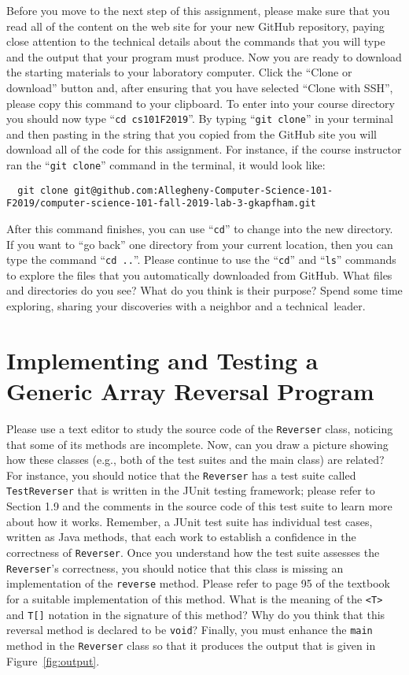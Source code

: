 \documentclass[11pt]{article}
\newcommand{\mainprogram}{\lstinline{Reverser}}
\newcommand{\testprogram}{\lstinline{TestReverser}}
\newcommand{\command}[1]{``\lstinline{#1}''}
\newcommand{\program}[1]{\lstinline{#1}}
\newcommand{\step}[1]{``{#1}''}
\begin{document}
Before you move to the next step of this assignment, please make sure that you
read all of the content on the web site for your new GitHub repository, paying
close attention to the technical details about the commands that you will type
and the output that your program must produce. Now you are ready to download the
starting materials to your laboratory computer. Click the ``Clone or download''
button and, after ensuring that you have selected ``Clone with SSH'', please
copy this command to your clipboard. To enter into your course directory you
should now type \command{cd cs101F2019}. By typing \command{git clone} in your
terminal and then pasting in the string that you copied from the GitHub site you
will download all of the code for this assignment. For instance, if the course
instructor ran the \command{git clone} command in the terminal, it would look
like:

\begin{lstlisting}
  git clone git@github.com:Allegheny-Computer-Science-101-F2019/computer-science-101-fall-2019-lab-3-gkapfham.git
\end{lstlisting}

After this command finishes, you can use \command{cd} to change into the new
directory. If you want to \step{go back} one directory from your current
location, then you can type the command \command{cd ..}. Please continue to use
the \command{cd} and \command{ls} commands to explore the files that you
automatically downloaded from GitHub. What files and directories do you see?
What do you think is their purpose? Spend some time exploring, sharing your
discoveries with a neighbor and a \mbox{technical leader}.

\section*{Implementing and Testing a Generic Array Reversal Program}

Please use a text editor to study the source code of the \mainprogram{} class,
noticing that some of its methods are incomplete. Now, can you draw a picture
showing how these classes (e.g., both of the test suites and the main class) are
related? For instance, you should notice that the \mainprogram{} has a test
suite called \testprogram{} that is written in the JUnit testing framework;
please refer to Section 1.9 and the comments in the source code of this test
suite to learn more about how it works. Remember, a JUnit test suite has
individual test cases, written as Java methods, that each work to establish a
confidence in the correctness of \mainprogram{}. Once you understand how the
test suite assesses the \mainprogram's correctness, you should notice that this
class is missing an implementation of the \program{reverse} method. Please refer
to page 95 of the textbook for a suitable implementation of this method. What is
the meaning of the \program{<T>} and \program{T[]} notation in the signature of
this method? Why do you think that this reversal method is declared to be
\program{void}? Finally, you must enhance the \program{main} method in the
\mainprogram{} class so that it produces the output that is given in
Figure~\ref{fig:output}.
\end{document}
